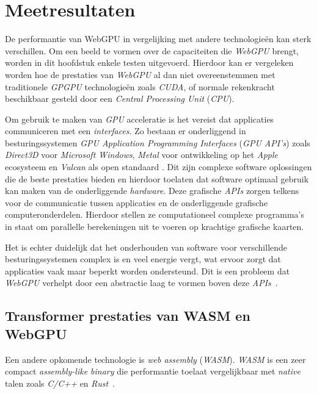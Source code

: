 \chapter{Meetresultaten}%
\label{ch:benchmarks}

De performantie van WebGPU in vergelijking met andere technologieën kan sterk verschillen. Om een beeld te vormen over de capaciteiten die \textit{WebGPU} brengt, worden in dit hoofdstuk enkele testen uitgevoerd. Hierdoor kan er vergeleken worden hoe de prestaties van \textit{WebGPU} al dan niet overeenstemmen met traditionele \textit{GPGPU} technologieën zoals \textit{CUDA}, of normale rekenkracht beschikbaar gesteld door een \textit{Central Processing Unit} (\textit{CPU}).

\bigbreak{}

Om gebruik te maken van \textit{GPU} acceleratie is het vereist dat applicaties communiceren met een \textit{interfaces}. Zo bestaan er onderliggend in besturingssystemen \textit{GPU Application Programming Interfaces} (\textit{GPU API's}) zoals \textit{Direct3D} voor \textit{Microsoft Windows}, \textit{Metal} voor ontwikkeling op het \textit{Apple} ecosysteem en \textit{Vulcan} als open standaard \autocite{Nguyen2022}. Dit zijn complexe software oplossingen die de beste prestaties bieden en hierdoor toelaten dat software optimaal gebruik kan maken van de onderliggende \textit{hardware}. Deze grafische \textit{APIs} zorgen telkens voor de communicatie tussen applicaties en de onderliggende grafische computeronderdelen. Hierdoor stellen ze computationeel complexe programma's in staat om parallelle berekeningen uit te voeren op krachtige grafische kaarten.



\bigbreak{}

Het is echter duidelijk dat het onderhouden van software voor verschillende besturingssystemen complex is en veel energie vergt, wat ervoor zorgt dat applicaties vaak maar beperkt worden ondersteund. Dit is een probleem dat \textit{WebGPU} verhelpt door een abstractie laag te vormen boven deze \textit{APIs}~\autocite{Wallez2023}.

\break{}

\section{Transformer prestaties van WASM en WebGPU}

Een andere opkomende technologie is \textit{web assembly} (\textit{WASM}). \textit{WASM} is een zeer compact \textit{assembly-like binary} die performantie toelaat vergelijkbaar met \textit{native} talen zoals \textit{C/C++} en \textit{Rust}~\autocite{Steiner2023}.


